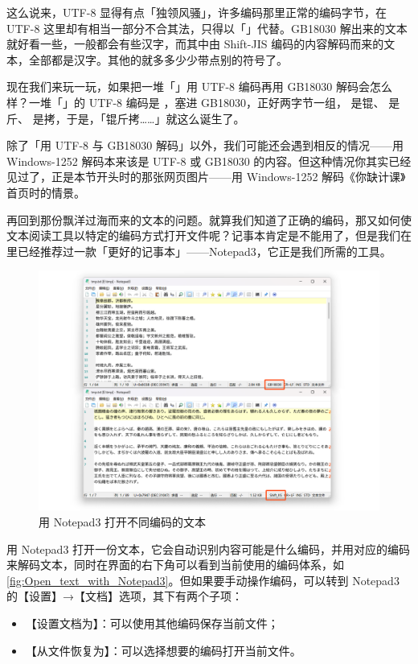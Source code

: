 这么说来，UTF-8 显得有点「独领风骚」，许多编码那里正常的编码字节，在 UTF-8 这里却有相当一部分不合其法，只得以「\replacesymb{}」代替。GB18030 解出来的文本就好看一些，一般都会有些汉字，而其中由 Shift-JIS 编码的内容解码而来的文本，全部都是汉字。其他的就多多少少带点别的符号了。

现在我们来玩一玩，如果把一堆「\replacesymb{}」用 UTF-8 编码再用 GB18030 解码会怎么样？一堆「\replacesymb{}」的 UTF-8 编码是 ，塞进 GB18030，正好两字节一组， 是锟、 是斤、 是拷，于是，「锟斤拷……」就这么诞生了。

除了「用 UTF-8 与 GB18030 解码」以外，我们可能还会遇到相反的情况——用 Windows-1252 解码本来该是 UTF-8 或 GB18030 的内容。但这种情况你其实已经见过了，正是本节开头时的那张网页图片——用 Windows-1252 解码《你缺计课》首页时的情景。

再回到那份飘洋过海而来的文本的问题。就算我们知道了正确的编码，那又如何使文本阅读工具以特定的编码方式打开文件呢？记事本肯定是不能用了，但是我们在里已经推荐过一款「更好的记事本」——Notepad3，它正是我们所需的工具。

\begin{figure}[htb!]
  \centering
  \includegraphics[width=.75\textwidth]{assets/advanced/Notepad3.png}
  \caption{用 Notepad3 打开不同编码的文本}
  \label{fig:Open_text_with_Notepad3}
\end{figure}

用 Notepad3 打开一份文本，它会自动识别内容可能是什么编码，并用对应的编码来解码文本，同时在界面的右下角可以看到当前使用的编码体系，如\autoref{fig:Open_text_with_Notepad3}。但如果要手动操作编码，可以转到 Notepad3 的【设置】→【文档】选项，其下有两个子项：

\begin{itemize}
  \item 【设置文档为】：可以使用其他编码保存当前文件；
  \item 【从文件恢复为】：可以选择想要的编码打开当前文件。
\end{itemize}

